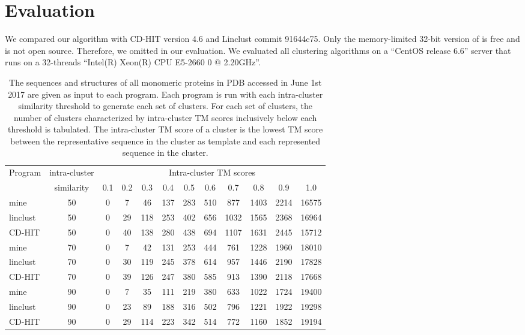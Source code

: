 \documentclass[]{article}
\begin{document}
\section{Evaluation}

We compared our algorithm with CD-HIT version 4.6 and Linclust commit 91644c75.
Only the memory-limited 32-bit version of \citet{edgar2010search} is free and \citet{edgar2010search} is not open source.
Therefore, we omitted \citet{edgar2010search} in our evaluation.
We evaluated all clustering algorithms on a ``CentOS release 6.6'' server that runs on a 32-threads ``Intel(R) Xeon(R) CPU E5-2660 0 @ 2.20GHz''.

\begin{table}%
	\centering
	\caption{
		The sequences and structures of all monomeric proteins in PDB accessed in June 1st 2017 are given as input to each program. 
		Each program is run with each intra-cluster similarity threshold to generate each set of clusters.
		For each set of clusters, the number of clusters characterized by intra-cluster TM scores inclusively below each threshold is tabulated.
		The intra-cluster TM score of a cluster is the lowest TM score between the representative sequence in the cluster as template and each represented sequence in the cluster.}
	\begin{tabular}{l c c c c c c c c c c c}
		
		\toprule
		Program & intra-cluster & \multicolumn{10}{c}{Intra-cluster TM scores} \\
		& similarity & 0.1 & 0.2 & 0.3 & 0.4 & 0.5 & 0.6 & 0.7 & 0.8 & 0.9 & 1.0 \\
		\midrule
		
		mine     & 50 & 0 & 7 & 46 & 137 & 283 & 510 & 877 & 1403 & 2214 & 16575 \\
		linclust & 50 & 0 & 29 & 118 & 253 & 402 & 656 & 1032 & 1565 & 2368 & 16964 \\
		CD-HIT   & 50 & 0 & 40 & 138 & 280 & 438 & 694 & 1107 & 1631 & 2445 & 15712 \\
		
		mine     & 70 & 0 & 7 & 42 & 131 & 253 & 444 & 761 & 1228 & 1960 & 18010 \\
		linclust & 70 & 0 & 30 & 119 & 245 & 378 & 614 & 957 & 1446 & 2190 & 17828 \\
		CD-HIT   & 70 & 0 & 39 & 126 & 247 & 380 & 585 & 913 & 1390 & 2118 & 17668 \\
		
		mine     & 90 & 0 & 7 & 35 & 111 & 219 & 380 & 633 & 1022 & 1724 & 19400 \\
		linclust & 90 & 0 & 23 & 89 & 188 & 316 & 502 & 796 & 1221 & 1922 & 19298 \\
		CD-HIT   & 90 & 0 & 29 & 114 & 223 & 342 & 514 & 772 & 1160 & 1852 & 19194 \\
		
		\bottomrule
	\end{tabular}
	\label{table:pdb}
\end{table}
\end{document}
